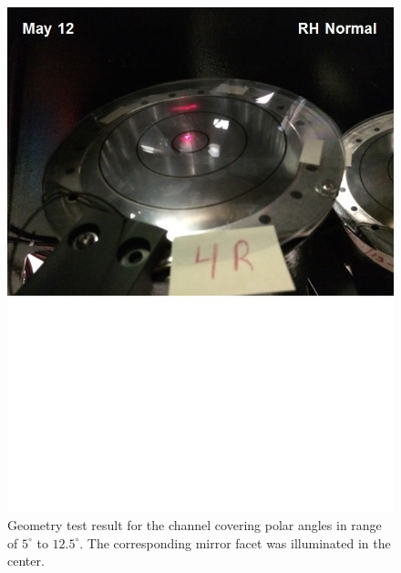 \begin{figure}[ht]
    \centering
    \includegraphics[width=1.0\linewidth,trim={0 8.5cm 0 0},clip]{images/GEO_TEST_4_Normal.jpg}
    \caption{Geometry test result for the channel covering polar angles in range of $5^\circ$ to $12.5^\circ$. The corresponding mirror facet was illuminated in the center.}
    \label{fig:GEO_TEST_4_Normal}
\end{figure}

